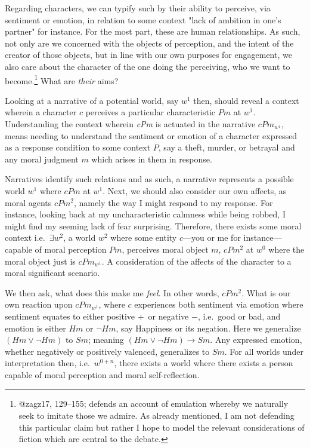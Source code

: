\documentclass[
  letterpaper,
  DIV=11,
  numbers=noendperiod]{scrartcl}
\theoremstyle{remark}
\begin{document}
Regarding characters, we can typify such by their ability to perceive,
via sentiment or emotion, in relation to some context "lack of ambition
in one's partner" for instance. For the most part, these are human
relationships. As such, not only are we concerned with the objects of
perception, and the intent of the creator of those objects, but in line
with our own purposes for engagement, we also care about the character
of the one doing the perceiving, who we want to become.\footnote{@zagz17,
  129--155; defends an account of emulation whereby we naturally seek to
  imitate those we admire. As already mentioned, I am not defending this
  particular claim but rather I hope to model the relevant
  considerations of fiction which are central to the debate.} What are
\emph{their} aims?

Looking at a narrative of a potential world, say \emph{\(w^1\)} then,
should reveal a context wherein a character \(c\) perceives a particular
characteristic \(Pm\) at \emph{\(w^1\)}. Understanding the context
wherein \emph{cPm} is actuated in the narrative \(cPm_{w^{1}}\), means
needing to understand the sentiment or emotion of a character expressed
as a response condition to some context \(P\), say a theft, murder, or
betrayal and any moral judgment \(m\) which arises in them in response.

Narratives identify such relations and as such, a narrative represents a
possible world \(w^1\) where \(cPm\) at \(w^1\). Next, we should also
consider our own affects, as moral agents \(cPm^{2}\), namely the way I
might respond to my response. For instance, looking back at my
uncharacteristic calmness while being robbed, I might find my seeming
lack of fear surprising. Therefore, there exists some moral context
i.e.~\(\exists w^2\), a world \(w^2\) where some entity \(c\)---you or
me for instance---capable of moral perception \(Pm\), perceives moral
object \(m\), \(cPm^{2}\) at \(w^0\) where the moral object just is
\(cPm_{w^{1}}\). A consideration of the affects of the character to a
moral significant scenario.

We then ask, what does this make me \emph{feel}. In other words,
\(cPm^{2}\). What is our own reaction upon \(cPm_{w^1}\), where \(c\)
experiences both sentiment via emotion where sentiment equates to either
positive \(+\)~or negative \(-\), i.e.~good or bad, and emotion is
either \(Hm\) or \(\neg Hm\), say Happiness or its negation. Here we
generalize \(( Hm  \lor \neg  Hm)\) to \(Sm\); meaning
\(( Hm \lor \neg Hm ) \rightarrow Sm\). Any expressed emotion, whether
negatively or positively valenced, generalizes to \(Sm\). For all worlds
under interpretation then, i.e.~\(w^{0+n}\), there exists a world where
there exists a person capable of moral perception and moral
self-reflection.
\end{document}
